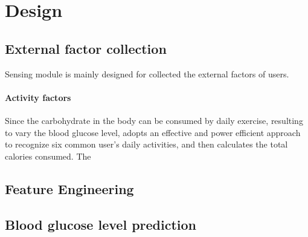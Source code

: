 
\section{Design}
\label{sec:design}

\subsection{External factor collection}
Sensing module is mainly designed for collected the external factors of users.

\paragraph{Activity factors}
Since the carbohydrate in the body can be consumed by daily exercise, resulting to vary the blood glucose level, \sysname adopts an effective and power efficient approach \cite{bib:kwapisz2011activity} to recognize six common user's daily activities, and then calculates the total calories consumed. The 




\subsection{Feature Engineering}


\subsection{Blood glucose level prediction}
